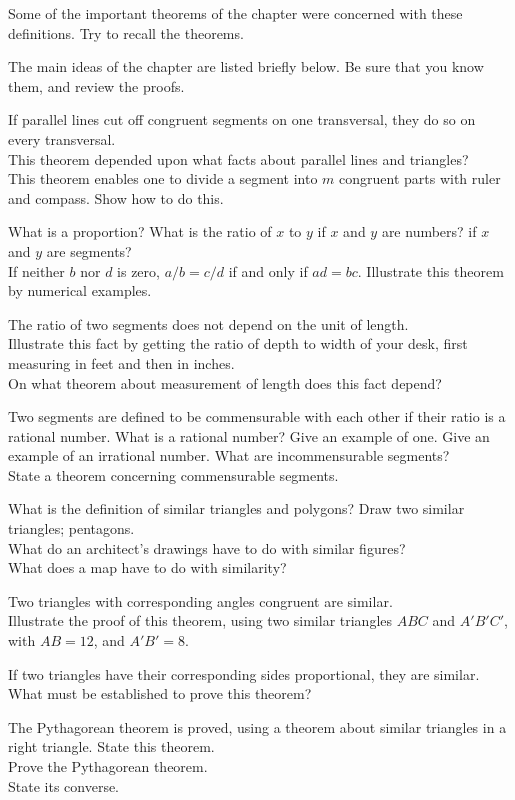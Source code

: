 \documentclass[11pt]{book}
\theoremstyle{bkplain}
\theoremstyle{XIplainnote}
\theoremstyle{bkplain}
\theoremstyle{bkplain}
\begin{document}
Some of the important theorems of the chapter were concerned with these
definitions. Try to recall the theorems.

The main ideas of the chapter are listed briefly below. Be sure that you know
them, and review the proofs.

\begin{exlist}
\item If parallel lines cut off congruent segments on one transversal, they do so
      on every transversal.\\
      This theorem depended upon what facts about parallel lines and triangles?\\
      This theorem enables one to divide a segment into $m$ congruent parts with
      ruler and compass. Show how to do this.
\item What is a proportion? What is the ratio of $x$ to $y$ if $x$ and $y$ are
      numbers? if $x$ and $y$ are segments?\\
      If neither $b$ nor $d$ is zero, $a/b = c/d$ if and only if $ad = bc$.
      Illustrate this theorem by numerical examples.
\item The ratio of two segments does not depend on the unit of length.\\
      Illustrate this fact by getting the ratio of depth to width of your desk,
      first measuring in feet and then in inches.\\
      On what theorem about measurement of length does this fact depend?
\item[\stex 4.] Two segments are defined to be commensurable with each other if
      their ratio is a rational number. What is a rational number? Give an
      example of one. Give an example of an irrational number. What are
      incommensurable segments?\\
      State a theorem concerning commensurable segments.
\item[5.] What is the definition of similar triangles and polygons? Draw two
      similar triangles; pentagons.\\
      What do an architect's drawings have to do with similar figures?\\
      What does a map have to do with similarity?
\item[6.] Two triangles with corresponding angles congruent are similar.\\
      Illustrate the proof of this theorem, using two similar triangles $ABC$
      and $A'B'C'$, with $AB = 12$, and $A'B' = 8$.
\item[7.] If two triangles have their corresponding sides proportional, they
      are similar.\\
      What must be established to prove this theorem?
\item[8.] The Pythagorean theorem is proved, using a theorem about similar
      triangles in a right triangle. State this theorem.\\
      Prove the Pythagorean theorem.\\
      State its converse.
\end{exlist}
\end{document}
